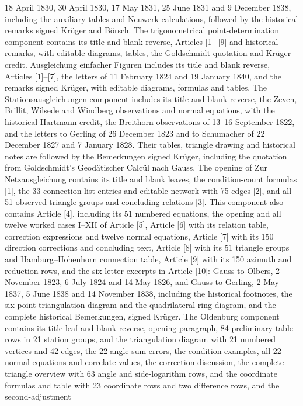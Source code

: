 18 April 1830, 30 April 1830, 17 May 1831, 25 June 1831 and 9 December 1838,
including the auxiliary tables and Neuwerk calculations, followed by the
historical remarks signed Krüger and Börsch. The trigonometrical
point-determination component contains its title and blank reverse,
Articles [1]--[9] and historical remarks, with editable diagrams, tables,
the Goldschmidt quotation and Krüger credit.
Ausgleichung einfacher Figuren includes its title and blank reverse,
Articles [1]--[7], the letters of 11 February 1824 and 19 January 1840,
and the remarks signed Krüger, with editable diagrams, formulas and tables.
The Stationsausgleichungen component includes its title and blank reverse,
the Zeven, Brillit, Wilsede and Windberg observations and normal equations,
with the historical Hartmann credit, the Breithorn observations of 13--16 September 1822, and the letters
to Gerling of 26 December 1823 and to Schumacher of 22 December 1827
and 7 January 1828. Their tables, triangle drawing and historical notes
are followed by the Bemerkungen signed Krüger, including the quotation
from Goldschmidt's Geodätischer Calcül nach Gauss. The opening of Zur Netzausgleichung
contains its title and blank leaves, the condition-count formulas [1],
the 33 connection-list entries and editable network with 75 edges [2],
and all 51 observed-triangle groups and concluding relations [3].
This component also contains Article [4], including its 51 numbered equations,
the opening and all twelve worked cases I--XII of Article [5], Article [6] with its
relation table, correction expressions and twelve normal equations,
Article [7] with its 150 direction corrections and concluding text,
Article [8] with its 51 triangle groups and Hamburg--Hohenhorn connection table,
Article [9] with its 150 azimuth and reduction rows,
and the six letter excerpts in Article [10]: Gauss to Olbers,
2 November 1823, 6 July 1824 and 14 May 1826, and Gauss to Gerling,
2 May 1837, 5 June 1838 and 14 November 1838, including the historical footnotes,
the six-point triangulation diagram and the quadrilateral ring diagram,
and the complete historical Bemerkungen, signed Krüger.
The Oldenburg component contains its title leaf and blank reverse, opening paragraph,
84 preliminary table rows in 21 station groups, and the triangulation
diagram with 21 numbered vertices and 42 edges, the 22 angle-sum errors,
the condition examples, all 22 normal equations and correlate values,
the correction discussion, the complete triangle overview with 63 angle
and side-logarithm rows, and the coordinate formulas and table with
23 coordinate rows and two difference rows, and the second-adjustment
